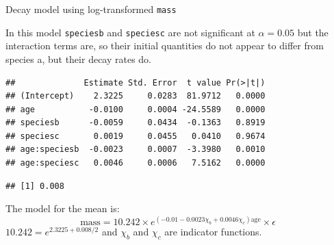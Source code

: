 \documentclass[
  ignorenonframetext,
]{beamer}
\newenvironment{Shaded}{\begin{snugshade}}{\end{snugshade}}
\newcommand{\DataTypeTok}[1]{\textcolor[rgb]{0.13,0.29,0.53}{#1}}
\newcommand{\DecValTok}[1]{\textcolor[rgb]{0.00,0.00,0.81}{#1}}
\newcommand{\KeywordTok}[1]{\textcolor[rgb]{0.13,0.29,0.53}{\textbf{#1}}}
\newcommand{\NormalTok}[1]{#1}
\newcommand{\OperatorTok}[1]{\textcolor[rgb]{0.81,0.36,0.00}{\textbf{#1}}}
\newcommand{\StringTok}[1]{\textcolor[rgb]{0.31,0.60,0.02}{#1}}
\begin{document}
\begin{frame}[fragile]{Decay model using log-transformed \texttt{mass}}
\protect\hypertarget{decay-model-using-log-transformed-mass}{}

In this model \texttt{speciesb} and \texttt{speciesc} are not
significant at \(\alpha=0.05\) but the interaction terms are, so their
initial quantities do not appear to differ from species a, but their
decay rates do.

\scriptsize

\begin{Shaded}
\end{Shaded}

\begin{verbatim}
##              Estimate Std. Error  t value Pr(>|t|)
## (Intercept)    2.3225     0.0283  81.9712   0.0000
## age           -0.0100     0.0004 -24.5589   0.0000
## speciesb      -0.0059     0.0434  -0.1363   0.8919
## speciesc       0.0019     0.0455   0.0410   0.9674
## age:speciesb  -0.0023     0.0007  -3.3980   0.0010
## age:speciesc   0.0046     0.0006   7.5162   0.0000
\end{verbatim}

\begin{Shaded}
\end{Shaded}

\begin{verbatim}
## [1] 0.008
\end{verbatim}

\normalsize

The model for the mean is: \[
\text{mass} = 10.242 \times e^{(-0.01-0.0023\chi_b+0.0046\chi_c)\text{age}}\times\epsilon
\] \(10.242 = e^{2.3225+0.008/2}\) and \(\chi_b\) and \(\chi_c\) are
indicator functions.

\end{frame}
\end{document}
